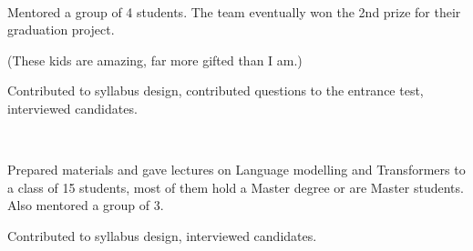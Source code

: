 \\
\begin{zitemize}
    \item Mentored a group of 4 students. The team eventually won the 2nd prize for their graduation project.
    \item (These kids are amazing, far more gifted than I am.)
    \item Contributed to syllabus design, contributed questions to the entrance test, interviewed candidates.
\end{zitemize}

\\
\begin{zitemize}
    \item Prepared materials and gave lectures on Language modelling and Transformers to a class of 15 students, most of them hold a Master degree or are Master students. Also mentored a group of 3.
    \item Contributed to syllabus design, interviewed candidates.
\end{zitemize}